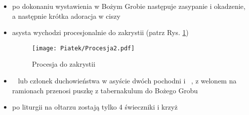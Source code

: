 \begin{itemize}
	\item po dokonaniu wystawienia w Bożym Grobie następuje zasypanie i
	      okadzenie, a następnie krótka adoracja w ciszy
	\item asysta wychodzi procesjonalnie do zakrystii (patrz Rys. \ref{fig:procesja2_pt})

	      \begin{figure}[t!]
		      \centering
		      \texttt{[image: Piatek/Procesja2.pdf]}
		      \caption{Procesja do zakrystii}
		      \label{fig:procesja2_pt}
	      \end{figure}

	\item \ii~ lub członek duchowieństwa w asyście dwóch pochodni i \oo~, z welonem
	      na ramionach przenosi puszkę z tabernakulum do Bożego Grobu
	\item po liturgii na ołtarzu zostają tylko 4 świeczniki i krzyż
\end{itemize}

